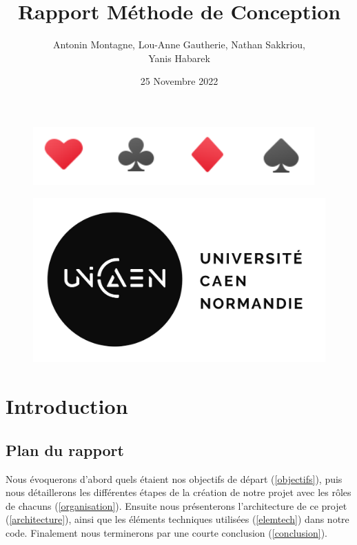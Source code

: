 \documentclass[french,12pt]{article}
\title{Rapport Méthode de Conception}
\author{Antonin Montagne, Lou-Anne Gautherie, Nathan Sakkriou, \\
Yanis Habarek}
\date{25 Novembre 2022}
\begin{document}
\maketitle

\begin{figure}[h]
	\begin{center}
		\includegraphics[scale=0.4]{img/fond.png}	
	\end{center}
\end{figure}

\begin{figure}[b]
	\begin{center}
		\includegraphics[scale=0.7]{img/unicaen.png}	
	\end{center}
\end{figure}

\thispagestyle{empty}
\setcounter{page}{0}
\newpage

\tableofcontents
\newpage

\section{Introduction}

\subsection{Plan du rapport}

Nous évoquerons d'abord quels étaient nos objectifs de départ (\ref{objectifs}), puis nous détaillerons les différentes étapes de la création de notre projet avec les rôles de chacuns (\ref{organisation}). Ensuite nous présenterons l'architecture de ce projet (\ref{architecture}), ainsi que les éléments techniques utilisées (\ref{elemtech}) dans notre code. Finalement nous terminerons par une courte conclusion (\ref{conclusion}).
\end{document}
